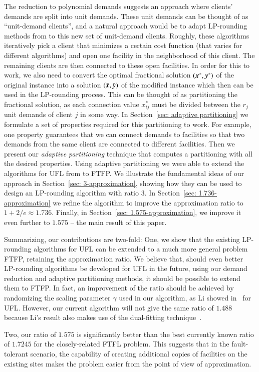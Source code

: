 The reduction to polynomial demands suggests an approach
where clients' demands are split into unit demands. These
unit demands can be thought of as ``unit-demand clients'',
and a natural approach would be to adapt LP-rounding methods
from \cite{gupta08,ChudakS04,ByrkaGS10} to this new set of
unit-demand clients.  Roughly, these algorithms iteratively
pick a client that minimizes a certain cost function (that
varies for different algorithms) and open one facility in
the neighborhood of this client. The remaining clients are
then connected to these open facilities.  In order for this
to work, we also need to convert the optimal fractional
solution $(\boldsymbol{x}^\ast,\boldsymbol{y}^\ast)$ of the original instance
into a solution $(\bar{\boldsymbol{x}},\bar{\boldsymbol{y}})$ of the modified instance
which then can be used in the LP-rounding process. This can
be thought of as partitioning the fractional solution, as
each connection value $x^\ast_{ij}$ must be divided between
the $r_j$ unit demands of client $j$ in some way. In
Section~\ref{sec: adaptive partitioning} we formulate a set
of properties required for this partitioning to work. For
example, one property guarantees that we can connect demands
to facilities so that two demands from the same client are
connected to different facilities. Then we present our
\emph{adaptive partitioning} technique that computes a
partitioning with all the desired properties. Using adaptive
partitioning we were able to extend the algorithms for UFL
from \cite{gupta08,ChudakS04,ByrkaGS10} to FTFP. We
illustrate the fundamental ideas of our approach in
Section~\ref{sec: 3-approximation}, showing how they can be
used to design an LP-rounding algorithm with ratio $3$.  In
Section~\ref{sec: 1.736-approximation} we refine the
algorithm to improve the approximation ratio to
$1+2/e\approx 1.736$.  Finally, in Section~\ref{sec:
  1.575-approximation}, we improve it even further to
$1.575$ -- the main result of this paper.

Summarizing, our contributions are two-fold: One, we show
that the existing LP-rounding algorithms for UFL can be
extended to a much more general problem FTFP, retaining the
approximation ratio. We believe that, should even better
LP-rounding algorithms be developed for UFL in the future,
using our demand reduction and adaptive partitioning
methods, it should be possible to extend them to FTFP.  In
fact, an improvement of the ratio should be achieved by
randomizing the scaling parameter $\gamma$ used in our
algorithm, as Li showed in~\cite{Li11} for UFL. However, our
current algorithm will not give the same ratio of $1.488$
because Li's result also makes use of the dual-fitting
technique~\cite{MahdianMSV01}.

Two, our ratio of $1.575$ is significantly better than the
best currently known ratio of $1.7245$ for the
closely-related FTFL problem. This suggests that in the
fault-tolerant scenario, the capability of creating
additional copies of facilities on the existing sites makes
the problem easier from the point of view of approximation.
